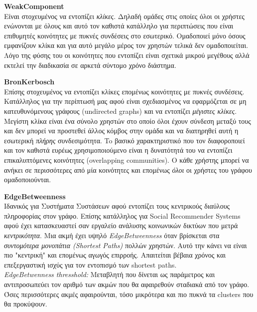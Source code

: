 \begin{description}
\item \textbf{WeakComponent}  \hfill \\
Είναι στοχευμένος να εντοπίζει \emph{κλίκες}. Δηλαδή ομάδες στις οποίες όλοι οι χρήστες 
ενώνονται με όλους και αυτό τον καθιστά κατάλληλο για περιπτώσεις που είναι 
επιθυμητές κοινότητες με πυκνές συνδέσεις στο εσωτερικό.
Ομαδοποιεί μόνο όσους εμφανίζουν κλίκα και για αυτό 
μεγάλο μέρος τον χρηστών τελικά δεν ομαδοποιείται.
Λόγο της φύσης του οι κοινότητες που εντοπίζει είναι σχετικά μικρού μεγέθους 
αλλά εκτελεί την διαδικασία σε αρκετά σύντομο χρόνο διάστημα.
\item \textbf{BronKerbosch}  \hfill \\
Επίσης στοχευμένος να εντοπίζει κλίκες επομένως κοινότητες με πυκνές συνδέσεις. 
Κατάλληλος για την περίπτωσή μας αφού είναι σχεδιασμένος να εφαρμόζεται σε 
μη κατευθυνόμενους γράφους (undirected graphs) και να εντοπίζει \emph{μέγιστες κλίκες}. 
Μεγίστη κλίκα είναι ένα σύνολο χρηστών στο οποίο όλοι έχουν σύνδεση μεταξύ τους 
και δεν μπορεί να προστεθεί άλλος κόμβος στην ομάδα και να διατηρηθεί αυτή η εσωτερική 
\emph{πλήρης} συνδεσιμότητα.
To βασικό χαρακτηριστικό που τον διαφοροποιεί και τον καθιστά ευρέως 
χρησιμοποιούμενο είναι η δυνατότητά του να εντοπίζει επικαλυπτόμενες κοινότητες 
(overlapping communities). Ο κάθε χρήστης μπορεί να ανήκει σε περισσότερες από 
μία κοινότητες και επομένως \emph{όλοι} οι χρήστες του γράφου ομαδοποιούνται. 
\item \textbf{EdgeBetweenness}  \hfill \\
Ιδανικός για Συστήματα Συστάσεων αφού εντοπίζει τους κεντρικούς διαύλους πληροφορίας στον γράφο.
Επίσης κατάλληλος για Social Recommender Systems αφού έχει κατασκευαστεί σαν εργαλείο 
ανάλυσης κοινωνικών δικτύων που μετρά \emph{κεντρικότητα}. 
Μια ακμή έχει υψηλό \emph{EdgeBetweenness} όταν βρίσκεται στα \emph{συντομότερα μονοπάτια
(Shortest Paths)} πολλών χρηστών. Αυτό την κάνει να είναι πιο "κεντρική" και επομένως
αγωγός επιρροής. Απαιτείται βέβαια χρόνος και επεξεργαστική ισχύς για τον εντοπισμό των 
shortest paths.\\

\emph{EdgeBetwenness thresshold: }Μεταβλητή που δίνεται ως παράμετρος και αντιπροσωπεύει τον αριθμό
των ακμών που θα αφαιρεθούν σταδιακά από τον γράφο. Όσες περισσότερες ακμές αφαιρούνται, τόσο μικρότερα και 
πιο πυκνά τα clusters που θα προκύψουν.


\end{description}
